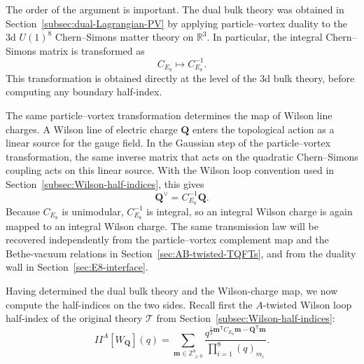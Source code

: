 \documentclass[11pt,a4paper]{article}
\numberwithin{equation}{section}
\begin{document}
The order of the argument is important.  The dual bulk theory was obtained in Section~\ref{subsec:dual-Lagrangian-PV} by applying particle--vortex duality to the 3d $U(1)^8$ Chern--Simons matter theory on $\mathbb R^3$.  In particular, the integral Chern--Simons matrix is transformed as
\begin{equation}
  C_{E_8}\longmapsto C_{E_8}^{-1}.
  \label{eq:bulk-CS-inverse-map-recap}
\end{equation}
This transformation is obtained directly at the level of the 3d bulk theory, before computing any boundary half-index.

The same particle--vortex transformation determines the map of Wilson line charges.  A Wilson line of electric charge $\boldsymbol Q$ enters the topological action as a linear source for the gauge field.  In the Gaussian step of the particle--vortex transformation, the same inverse matrix that acts on the quadratic Chern--Simons coupling acts on this linear source.  With the Wilson loop convention used in Section~\ref{subsec:Wilson-half-indices}, this gives
\begin{equation}
  \boldsymbol Q^\vee=C_{E_8}^{-1}\boldsymbol Q.
  \label{eq:Wilson-charge-pv-map}
\end{equation}
Because $C_{E_8}$ is unimodular, $C_{E_8}^{-1}$ is integral, so an integral Wilson charge is again mapped to an integral Wilson charge.  The same transmission law will be recovered independently from the particle--vortex complement map and the Bethe-vacuum relations in Section~\ref{sec:AB-twisted-TQFTs}, and from the duality wall in Section~\ref{sec:E8-interface}.

Having determined the dual bulk theory and the Wilson-charge map, we now compute the half-indices on the two sides.  Recall first the $A$-twisted Wilson loop half-index of the original theory $\mathcal T$ from Section~\ref{subsec:Wilson-half-indices}:
\begin{equation}
  I\!\!I^{A}[W_{\boldsymbol Q}](q)
  =\sum_{\boldsymbol m\in\mathbb Z_{\geq0}^{8}}
  \frac{
  q^{\frac12\boldsymbol m^{\mathsf T}C_{E_8}\boldsymbol m
  -\boldsymbol Q^{\mathsf T}\boldsymbol m}
  }{
  \prod_{i=1}^{8}(q)_{m_i}
  }.
  \label{eq:original-Wilson-half-recalled}
\end{equation}
\end{document}
